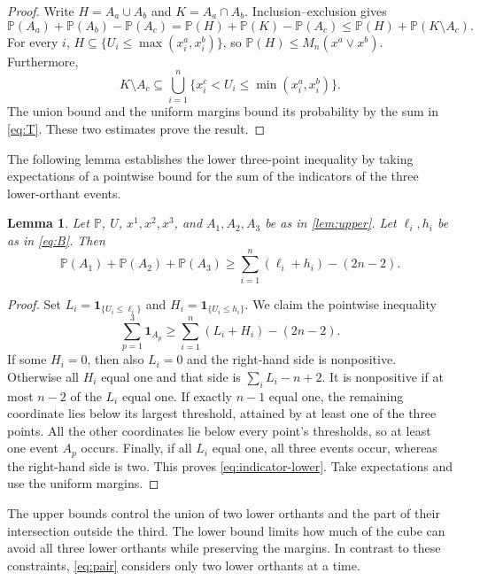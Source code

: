 \documentclass[a4paper,11pt]{amsart}
\numberwithin{equation}{section}
\newtheorem{lemma}[lemma]{Lemma}
\theoremstyle{definition}
\theoremstyle{remark}
\newcommand{\Prob}{\mathbb P}
\begin{document}
\begin{proof}
Write $H=A_a\cup A_b$ and $K=A_a\cap A_b$. Inclusion--exclusion gives
\[
 \Prob(A_a)+\Prob(A_b)-\Prob(A_c)
 =\Prob(H)+\Prob(K)-\Prob(A_c)
 \leq\Prob(H)+\Prob(K\setminus A_c).
\]
For every $i$, $H\subseteq\{U_i\leq\max(x_i^a,x_i^b)\}$, so
$\Prob(H)\leq M_n(x^a\vee x^b)$.
Furthermore,
\[
 K\setminus A_c\subseteq
 \bigcup_{i=1}^n\{x_i^c<U_i\leq\min(x_i^a,x_i^b)\}.
\]
The union bound and the uniform margins bound its probability by the sum
in \eqref{eq:T}. These two estimates prove the result.
\end{proof}

The following lemma establishes the lower three-point inequality by
taking expectations of a pointwise bound for the sum of the indicators
of the three lower-orthant events.

\begin{lemma}\label{lem:lower}
Let $\Prob$, $U$, $x^1,x^2,x^3$, and $A_1,A_2,A_3$ be as in
\cref{lem:upper}. Let $\ell_i,h_i$ be as in \eqref{eq:B}. 
Then
\[
 \Prob(A_1)+\Prob(A_2)+\Prob(A_3)
 \geq \sum_{i=1}^n(\ell_i+h_i)-(2n-2).
\]
\end{lemma}
\begin{proof}
Set $L_i=\boldsymbol{1}_{\{U_i\leq\ell_i\}}$ and
$H_i=\boldsymbol{1}_{\{U_i\leq h_i\}}$. We claim the pointwise inequality
\begin{equation}
 \sum_{p=1}^3\boldsymbol{1}_{A_p}
 \geq\sum_{i=1}^n(L_i+H_i)-(2n-2).\label{eq:indicator-lower}
\end{equation}
If some $H_i=0$, then also $L_i=0$ and the right-hand side is nonpositive.
Otherwise all $H_i$ equal one and that side is
$\sum_iL_i-n+2$. It is nonpositive if at most $n-2$ of the $L_i$ equal one.
If exactly $n-1$ equal one, the remaining coordinate lies below its largest
threshold, attained by at least one of the three points. All the other
coordinates lie below every point's thresholds, so at least one event
$A_p$ occurs. Finally, if all $L_i$ equal one, all three events
occur, whereas the right-hand side is two. This proves
\eqref{eq:indicator-lower}. Take expectations and use the uniform margins.
\end{proof}

The upper bounds control the union of two lower orthants and the part of
their intersection outside the third. The lower bound limits how much of
the cube can avoid all three lower orthants while preserving the margins.
In contrast to these constraints, \eqref{eq:pair} considers only two
lower orthants at a time.
\end{document}
